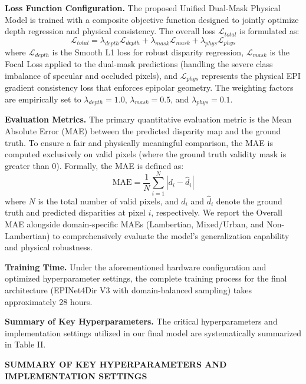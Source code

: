 \documentclass[lettersize,journal]{IEEEtran}
\begin{document}
\textbf{Loss Function Configuration.} 
The proposed Unified Dual-Mask Physical Model is trained with a composite objective function designed to jointly optimize depth regression and physical consistency. The overall loss $\mathcal{L}_{total}$ is formulated as:
\begin{equation}
\label{eq:eq27}
\mathcal{L}_{total} = \lambda_{depth} \mathcal{L}_{depth} + \lambda_{mask} \mathcal{L}_{mask} + \lambda_{phys} \mathcal{L}_{phys}
\end{equation}
where $\mathcal{L}_{depth}$ is the Smooth L1 loss for robust disparity regression, $\mathcal{L}_{mask}$ is the Focal Loss applied to the dual-mask predictions (handling the severe class imbalance of specular and occluded pixels), and $\mathcal{L}_{phys}$ represents the physical EPI gradient consistency loss that enforces epipolar geometry. The weighting factors are empirically set to $\lambda_{depth} = 1.0$, $\lambda_{mask} = 0.5$, and $\lambda_{phys} = 0.1$.

\textbf{Evaluation Metrics.} 
The primary quantitative evaluation metric is the Mean Absolute Error (MAE) between the predicted disparity map and the ground truth. To ensure a fair and physically meaningful comparison, the MAE is computed exclusively on valid pixels (where the ground truth validity mask is greater than 0). Formally, the MAE is defined as:
\begin{equation}
\label{eq:eq28}
\text{MAE} = \frac{1}{N} \sum_{i=1}^{N} |d_i - \hat{d}_i|
\end{equation}
where $N$ is the total number of valid pixels, and $d_i$ and $\hat{d}_i$ denote the ground truth and predicted disparities at pixel $i$, respectively. We report the Overall MAE alongside domain-specific MAEs (Lambertian, Mixed/Urban, and Non-Lambertian) to comprehensively evaluate the model's generalization capability and physical robustness.

\textbf{Training Time.} 
Under the aforementioned hardware configuration and optimized hyperparameter settings, the complete training process for the final architecture (EPINet4Dir V3 with domain-balanced sampling) takes approximately 28 hours.

\textbf{Summary of Key Hyperparameters.}
The critical hyperparameters and implementation settings utilized in our final model are systematically summarized in Table II.

\textbf{SUMMARY OF KEY HYPERPARAMETERS AND IMPLEMENTATION SETTINGS}
\end{document}
